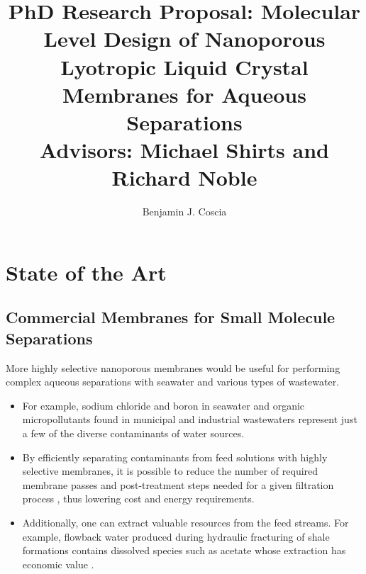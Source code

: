\documentclass{article}
\title{PhD Research Proposal: Molecular Level Design of Nanoporous Lyotropic Liquid
Crystal Membranes for Aqueous Separations \\ \vspace{0.5cm}
\large Advisors: Michael Shirts and Richard Noble}
\author{Benjamin J. Coscia}
\begin{document}
  \graphicspath{{./figures/}}

  \maketitle
  \thispagestyle{empty}
  \clearpage
  \setcounter{page}{1} %

  \section{State of the Art}\label{section:state-of-the-art}

  \subsection*{Commercial Membranes for Small Molecule Separations}
  
  
  More highly selective nanoporous membranes would be useful for 
  performing complex aqueous separations with seawater and various
  types of wastewater.
  \begin{itemize}
    \item For example, sodium chloride and boron in seawater 
    \cite{fritzmann_state---art_2007} and organic micropollutants found in
    municipal and industrial wastewaters \cite{schwarzenbach_challenge_2006}
    represent just a few of the diverse contaminants of water sources. 
    \item By efficiently separating contaminants from feed solutions with
    highly selective membranes, it is possible to reduce the number of 
    required membrane passes and post-treatment steps needed for a given 
    filtration process \cite{werber_materials_2016}, thus lowering cost
    and energy requirements. 
    \item Additionally, one can extract valuable resources from the 
    feed streams. For example, flowback water produced during hydraulic
    fracturing of shale formations contains dissolved species such as acetate
    whose extraction has economic value \cite{dischinger_application_2017}.
  \end{itemize}
\end{document}

